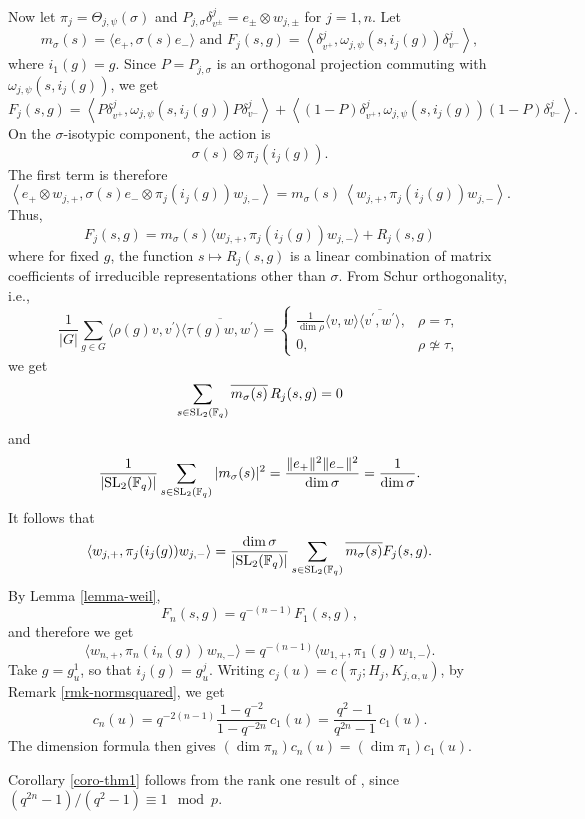 \documentclass[12pt]{amsart}
\theoremstyle{definition}
\theoremstyle{remark}
\begin{document}
Now let $\pi_j=\Theta_{j,\psi}(\sigma)$ and 
$
P_{j,\sigma}\delta_{v^\pm}^j = e_\pm\otimes w_{j,\pm}
$
for $j=1,n$. Let
\[
m_\sigma(s)=\langle e_+,\sigma(s)e_-\rangle \mbox{~and~}
F_j(s,g)=
\left\langle\delta_{v^+}^j,
\omega_{j,\psi}(s,i_j(g))\delta_{v^-}^j\right\rangle,
\]
where $i_1(g)=g$. 
Since $P=P_{j,\sigma}$ is an orthogonal projection commuting with $\omega_{j,\psi}(s,i_j(g))$, we get
\[
F_j(s,g)
=
\left\langle P\delta_{v^+}^j,
\omega_{j,\psi}(s,i_j(g))P\delta_{v^-}^j\right\rangle
+
\left\langle (1-P)\delta_{v^+}^j,
\omega_{j,\psi}(s,i_j(g))(1-P)\delta_{v^-}^j\right\rangle.
\] On the $\sigma$-isotypic component, the action is
\[
\sigma(s)\otimes\pi_j(i_j(g)).
\] The first term is therefore 
\[\left\langle e_+\otimes w_{j,+},
\sigma(s)e_-\otimes\pi_j(i_j(g))w_{j,-}\right\rangle
=
m_\sigma(s)\,
\left\langle w_{j,+},\pi_j(i_j(g))w_{j,-}\right\rangle.
\]
Thus,  
\[
F_j(s,g) = 
m_\sigma(s)
\langle w_{j,+},\pi_j(i_j(g))w_{j,-}\rangle + R_j(s,g)
\]
where for fixed $g$, the function $s\mapsto R_j(s,g)$ is a linear combination of matrix coefficients of irreducible representations other than $\sigma$.
From Schur orthogonality, i.e., 
\[\frac{1}{|G|} \sum_{g \in G} \langle \rho(g)v, v^\prime \rangle \overline{\langle \tau(g)w, w^\prime \rangle} =
\begin{cases}
 \frac{1}{\dim \rho} \langle v, w \rangle \overline{\langle v^\prime, w^\prime \rangle}, &\rho=\tau, \\
 0, &\rho \not\simeq \tau,
\end{cases}
\]
 we get
 \[
\sum_{s\in{\rm SL}_2(\mathbb F_q)}
\overline{m_\sigma(s)}\,R_j(s,g)=0
\]
and 
\[
\frac{1}{|{\rm SL}_2(\mathbb F_q)|}
\sum_{s\in{\rm SL}_2(\mathbb F_q)}
|m_\sigma(s)|^2
=
\frac{\|e_+\|^2\|e_-\|^2}{\dim\sigma}
=\frac{1}{\dim\sigma}.
\]
It follows that
\[
\langle w_{j,+},\pi_j(i_j(g))w_{j,-}\rangle
=
\frac{\dim\sigma}{|{\rm SL}_2(\mathbb F_q)|}
\sum_{s\in {\rm SL}_2(\mathbb F_q)}\overline{m_\sigma(s)} F_j(s,g).
\]
By Lemma \ref{lemma-weil},
\[
F_n(s,g)=q^{-(n-1)}F_1(s,g),
\]
and therefore we get
\[
\langle w_{n,+},\pi_n(i_n(g))w_{n,-}\rangle
=q^{-(n-1)}
\langle w_{1,+},\pi_1(g)w_{1,-}\rangle.
\]
Take $g=g_u^1$, so that $i_j(g)=g_u^j$.
Writing $c_j(u)=c(\pi_j;H_j,K_{j,\alpha,u})$, by Remark \ref{rmk-normsquared}, we get 
\[
c_n(u)
=q^{-2(n-1)}
  \frac{1-q^{-2}}{1-q^{-2n}}\,c_1(u)
=\frac{q^2-1}{q^{2n}-1}\,c_1(u).
\]
The dimension formula then gives
$(\dim\pi_n)c_n(u)=(\dim\pi_1)c_1(u)$.

Corollary \ref{coro-thm1} follows from the rank one result of \cite{ana25}, since $(q^{2n}-1)/(q^2-1)\equiv1\mod p$.
\end{document}
